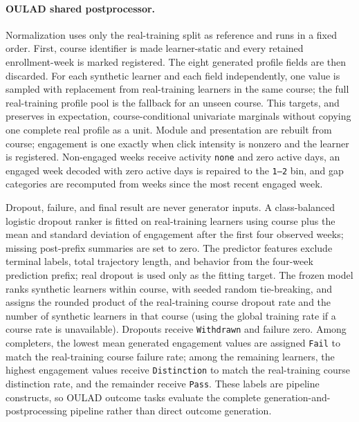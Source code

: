\documentclass[10pt]{article}
\begin{document}
\paragraph{OULAD shared postprocessor.}
Normalization uses only the real-training split as reference and runs in a fixed
order. First, course identifier is made learner-static and every retained
enrollment-week is marked registered. The eight generated profile fields are
then discarded. For each synthetic learner and each field independently, one
value is sampled with replacement from real-training learners in the same
course; the full real-training profile pool is the fallback for an unseen
course. This targets, and preserves in expectation, course-conditional
univariate marginals without copying one complete real profile as a unit.
Module and presentation are rebuilt from course;
engagement is one exactly when click intensity is nonzero and the learner is
registered. Non-engaged weeks receive activity \texttt{none} and zero active
days, an engaged week decoded with zero active days is repaired to the
\texttt{1--2} bin, and gap categories are recomputed from weeks since the most
recent engaged week.

Dropout, failure, and final result are never generator inputs. A class-balanced
logistic dropout ranker is fitted on real-training learners using course plus
the mean and standard deviation of engagement after the first four observed
weeks; missing post-prefix summaries are set to zero. The predictor features
exclude terminal labels, total trajectory length, and behavior from the
four-week prediction prefix; real dropout is used only as the fitting target.
The frozen model ranks synthetic learners within course, with seeded random
tie-breaking, and assigns the rounded product of the real-training course
dropout rate and the number of synthetic learners in that course (using the
global training rate if a course rate is unavailable). Dropouts receive
\texttt{Withdrawn} and failure zero. Among
completers, the lowest mean generated engagement values are assigned
\texttt{Fail} to match the real-training course failure rate; among the
remaining learners, the highest engagement values receive \texttt{Distinction}
to match the real-training course distinction rate, and the remainder receive
\texttt{Pass}. These labels are pipeline constructs, so OULAD outcome tasks
evaluate the complete generation-and-postprocessing pipeline rather than direct
outcome generation.
\end{document}
